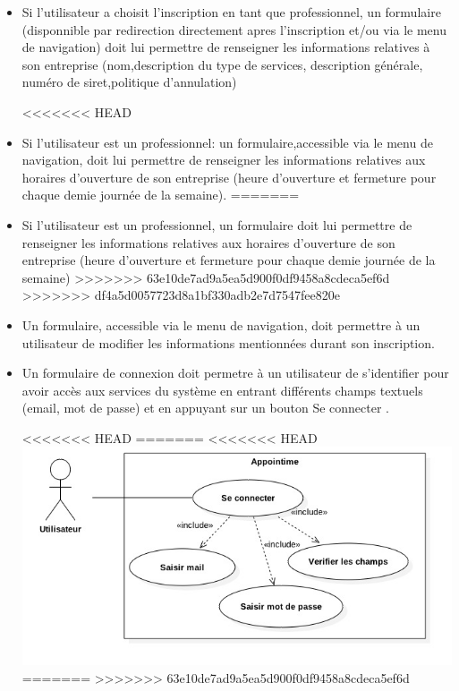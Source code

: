 \documentclass{article}
\begin{document}
\begin{itemize}
\begin{itemize}
\item Si l'utilisateur a choisit l'inscription en tant que professionnel, un formulaire (disponnible par redirection 
directement apres l'inscription et/ou via le menu de navigation) doit lui permettre de renseigner les informations relatives 
à son entreprise (nom,description du type de services, description générale, numéro de siret,politique d'annulation)

<<<<<<< HEAD
\item Si l'utilisateur est un professionnel: un formulaire,accessible via le menu de navigation,  doit lui permettre de renseigner les informations relatives aux 
horaires d'ouverture de son entreprise (heure d'ouverture et fermeture pour chaque demie journée de la semaine).
=======
\item Si l'utilisateur est un professionnel, un formulaire doit lui permettre de renseigner les informations relatives aux 
horaires d'ouverture de son entreprise (heure d'ouverture et fermeture pour chaque demie journée de la semaine)
>>>>>>> 63e10de7ad9a5ea5d900f0df9458a8cdeca5ef6d
>>>>>>> df4a5d0057723d8a1bf330adb2e7d7547fee820e

\item Un formulaire, accessible via le menu de navigation, doit permettre à un utilisateur de modifier les
  informations mentionnées durant son inscription.
\item Un formulaire de connexion doit permetre à un utilisateur de
  s'identifier pour avoir accès aux services du système en entrant
  différents champs textuels (email, mot de passe) et en appuyant sur
  un bouton \og Se connecter \fg{}.

<<<<<<< HEAD
=======
<<<<<<< HEAD
\includegraphics[scale=0.5]{ShematDiagrammes/useCaseConnexion.jpg}
=======
>>>>>>> 63e10de7ad9a5ea5d900f0df9458a8cdeca5ef6d


\end{itemize}
\end{itemize}
\end{document}

